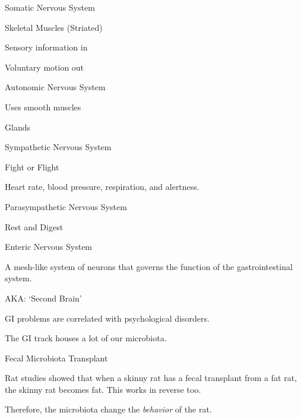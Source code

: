 \begin{coloredlist}
    \item Somatic Nervous System
    \begin{coloredlist}
        \item Skeletal Muscles (Striated)
        \item Sensory information in
        \item Voluntary motion out
    \end{coloredlist}
    \item Autonomic Nervous System
    \begin{coloredlist}
        \item Uses smooth muscles
        \item Glands
        \item Sympathetic Nervous System
        \begin{coloredlist}
            \item Fight or Flight
            \item Heart rate, blood pressure, respiration, and alertness.
        \end{coloredlist}
        \item Parasympathetic Nervous System
        \begin{coloredlist}
            \item Rest and Digest
        \end{coloredlist}
        \item Enteric Nervous System
        \begin{coloredlist}
            \item A mesh-like system of neurons that governs the function of the gastrointestinal system.
            \item AKA: `Second Brain'
            \item GI problems are correlated with psychological disorders.
            \item The GI track houses a lot of our microbiota.
            \item Fecal Microbiota Transplant
            \begin{coloredlist}
                \item Rat studies showed that when a skinny rat has a fecal transplant from a fat rat, the skinny rat becomes fat. This works in reverse too.
                \item Therefore, the microbiota change the \textit{behavior} of the rat.
            \end{coloredlist}

\end{coloredlist}
\end{coloredlist}
\end{coloredlist}
